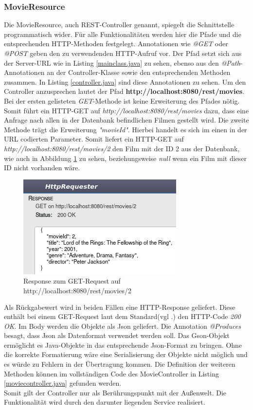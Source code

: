 \documentclass[fleqn,10.5pt,ngerman]{SelfArx}
\begin{document}
\subsubsection{MovieResource}
Die MovieResource, auch REST-Controller genannt, spiegelt die Schnittstelle programmatisch wider. Für alle Funktionalitäten werden hier die Pfade und die entsprechenden HTTP-Methoden festgelegt. Annotationen wie \textit{@GET} oder \textit{@POST} geben den zu verwendenden HTTP-Aufruf vor. Der Pfad setzt sich aus der Server-URL wie in Listing \ref{mainclass.java} zu sehen, ebenso aus den \textit{@Path}-Annotationen an der Controller-Klasse sowie den entsprechenden Methoden zusammen. In Listing \ref{controller.java} sind diese Annotationen zu sehen. Um den Controller anzusprechen lautet der Pfad \textbf{http://localhost:8080/rest/movies}. Bei der ersten gelisteten \textit{GET}-Methode ist keine Erweiterung des Pfades nötig. Somit führt ein HTTP-GET auf \textit{http://localhost:8080/rest/movies} dazu, dass eine Anfrage nach allen in der Datenbank befindlichen Filmen gestellt wird. Die zweite Methode trägt die Erweiterung \textit{"movieId"}. Hierbei handelt es sich im einen in der URL codierten Parameter.  Somit liefert ein HTTP-GET auf \textit{http://localhost:8080/rest/movies/2} den Film mit der ID 2 aus der Datenbank, wie auch in Abbildung \ref{fig:responsebrowser} zu sehen, beziehungsweise \textit{null} wenn ein Film mit dieser ID nicht vorhanden wäre. 
\begin{figure}[ht]\centering
	\includegraphics[width=8.5 cm]{Abbildungen/getid2.jpg}
	\caption{Response zum GET-Request auf http://localhost:8080/rest/movies/2}
	\label{fig:responsebrowser}
\end{figure}

Als Rückgabewert wird in beiden Fällen eine HTTP-Response geliefert. Diese enthält bei einem GET-Request laut dem Standard(vgl .\cite{httpcodes}) den HTTP-Code \textit{200 OK}. Im Body werden die Objekte als Json geliefert. Die Annotation \textit{@Produces} besagt, dass Json als Datenformat verwendet werden soll. Das Gson-Objekt ermöglicht es Java-Objekte in das entsprechende Json-Format zu bringen. Ohne die korrekte Formatierung wäre eine Serialisierung der Objekte nicht möglich und es würde zu Fehlern in der Übertragung kommen. Die Definition der weiteren Methoden können im vollständigen Code des MovieController in Listing \ref{moviecontroller.java} gefunden werden. \\ Somit gilt der Controller nur als Berührungspunkt mit der Außenwelt. Die Funktionalität wird durch den darunter liegenden Service realisiert.
\end{document}
